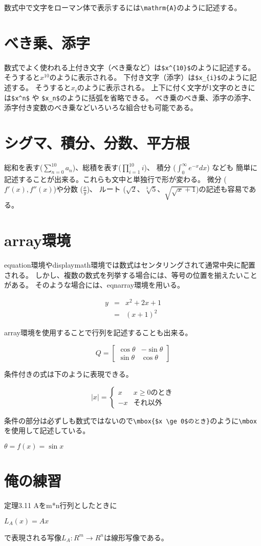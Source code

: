 \documentclass[fontsize=12pt,paper=a4]{jlreq}
\begin{document}
数式中で文字をローマン体で表示するには\verb|\mathrm{A}|のように記述する。

\section{べき乗、添字}

数式でよく使われる上付き文字（べき乗など）は\verb|$x^{10}$|のように記述する。
そうすると$x^{10}$のように表示される。
下付き文字（添字）は\verb|$x_{i}$|のように記述する。
そうすると$x_{i}$のように表示される。
上下に付く文字が1文字のときには\verb|$x^n$| 
や \verb|$x_n$|のように括弧を省略できる。
べき乗のべき乗、添字の添字、
添字付き変数のべき乗などいろいろな組合せも可能である。

\section{シグマ、積分、分数、平方根}

総和を表す($\sum_{n=0}^{10} a_n$)、総積を表す($\prod_{i=1}^{10} i$)、
積分 ($\int_0^\infty e^{-x} dx$) なども
簡単に記述することが出来る。これらも文中と単独行で形が変わる。
微分 ($f'(x), f''(x)$)や分数 ($\frac{x}{y}$)、
ルート ($\sqrt{2}$、$\sqrt[3]{5}$、$\sqrt{ \sqrt{x} + 1 }$)の記述も容易である。

\section{array環境}

equation環境やdisplaymath環境では数式はセンタリングされて通常中央に配置される。
しかし、複数の数式を列挙する場合には、等号の位置を揃えたいことがある。
そのような場合には、eqnarray環境を用いる。

\begin{eqnarray}
y & = & x^{2} + 2x + 1 \\
  & = & (x + 1) ^ {2} 
\end{eqnarray}

array環境を使用することで行列を記述することも出来る。

\begin{equation}
Q = \left[
\begin{array}{cc}
\cos\theta	& - \sin\theta		\\
\sin\theta	& \cos\theta
\end{array}
\right]
\end{equation}

条件付きの式は下のように表現できる。

\begin{equation}
|x| = \left\{
\begin{array}{rl}  %
 x & \mbox{$x \ge 0$のとき} \\
-x & \mbox{それ以外}
\end{array}
\right.            %
\end{equation}

条件の部分は必ずしも数式ではないので\verb|\mbox{$x \ge 0$のとき}|のように\verb|\mbox|を使用して記述している。

$\theta = f(x) = \sin x $

\section{俺の練習}
定理3.11 Aをm*n行列としたときに

$L_{A}(x) = Ax $

で表現される写像$L_{A}: R^{m} \to R^{n}$は線形写像である。
\end{document}
